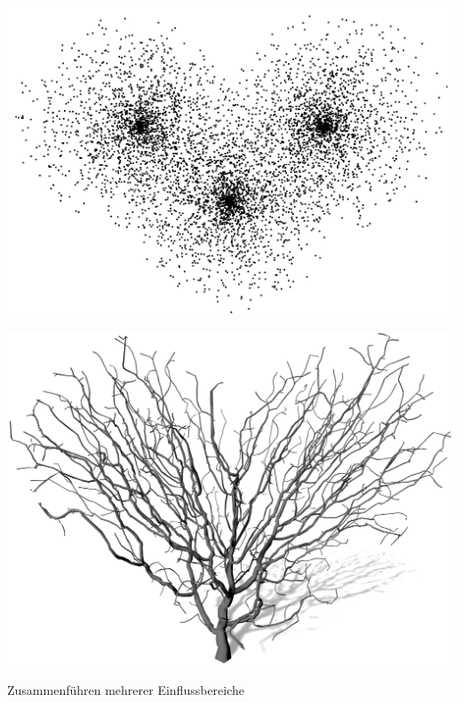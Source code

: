\newpage
\begin{center}
	\vfill
	\begin{minipage}[c]{0.45\textwidth}
		\centering
		\includegraphics[height=.65\textheight]{images/SCA_MultipleSpheres_Points}
	\end{minipage}
	\hspace{.05\textwidth}	
	\begin{minipage}[c]{0.45\textwidth}
		\centering
		\includegraphics[height=.65\textheight]{images/SCA_MultipleSpheres_Grown}
	\end{minipage}
	\vspace{0.1\textheight}

	Zusammenführen mehrerer Einflussbereiche
\end{center}



